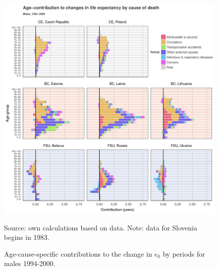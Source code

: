 \documentclass{article}
\begin{document}
\newpage

\begin{figure}[h!]
\caption{Age-cause-specific contributions to the change in $e_0$ by periods for males 1994-2000.}
\centering
\begin{center}
\includegraphics[scale=.5]{Figures/Cause_e0_decomp_Males_1.pdf}
\end{center}
Source: own calculations based on \citet{HMD} data. Note: data for Slovenia begins in 1983.
\end{figure}
\end{document}
